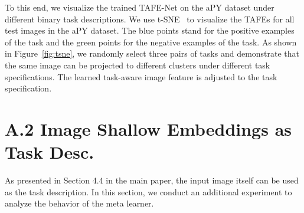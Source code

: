 \documentclass[10pt,twocolumn,letterpaper]{article}
\newcommand{\model}{TAFE-Net\xspace}
\begin{document}
To this end, we visualize the trained \model on the aPY dataset under different 
binary task descriptions. We use t-SNE~\cite{tsne} to visualize the TAFEs for 
all test images in the aPY dataset. The blue points stand for the positive examples
of the task and the green points for the negative examples of the task. As shown in Figure~\ref{fig:tsne}, we randomly select three pairs of tasks and demonstrate that 
the same image can be projected to different clusters under different task 
specifications. The learned task-aware image feature is adjusted to the task specification. 

\section*{A.2 Image Shallow Embeddings as Task Desc.}\label{sec:efficient}
As presented in Section 4.4 in the main paper, the input image itself can be used
as the task description. In this section, we conduct an additional experiment to
analyze the behavior of the meta learner. 
 
\end{document}
